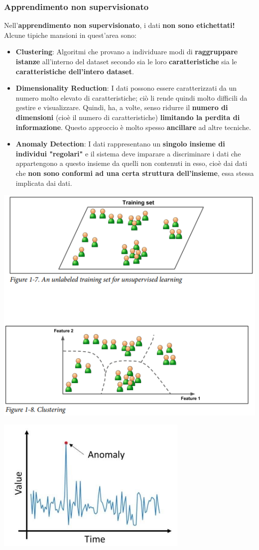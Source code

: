 \documentclass[12pt]{article}
\begin{document}
\subsubsection{Apprendimento non supervisionato}
Nell'\textbf{apprendimento non supervisionato}, i dati \textbf{non sono etichettati!}
Alcune tipiche mansioni in quest'area sono:
\begin{itemize}
    \item \textbf{Clustering}: Algoritmi che provano a individuare modi di \textbf{raggruppare istanze} all'interno del dataset secondo sia le loro \textbf{caratteristiche} sia le \textbf{caratteristiche dell'intero dataset}.
    \item \textbf{Dimensionality Reduction}: I dati possono essere caratterizzati da un numero molto elevato di caratteristiche; ciò li rende quindi molto difficili da gestire e visualizzare. Quindi, ha, a volte, senso ridurre il \textbf{numero di dimensioni} (cioè il numero di caratteristiche) \textbf{limitando la perdita di informazione}. Questo approccio è molto spesso \textbf{ancillare} ad altre tecniche.
    \item \textbf{Anomaly Detection}: I dati rappresentano un \textbf{singolo insieme di individui "regolari"} e il sistema deve imparare a discriminare i dati che appartengono a questo insieme da quelli non contenuti in esso, cioè dai dati che \textbf{non sono conformi ad una certa struttura dell'insieme}, essa stessa implicata dai dati.
\end{itemize}
\begin{center}
    \includegraphics[width =0.65\linewidth]{Images/61.PNG}
\end{center}
\begin{center}
    \includegraphics[width =0.50\linewidth]{Images/62.PNG}
\end{center}
\end{document}
